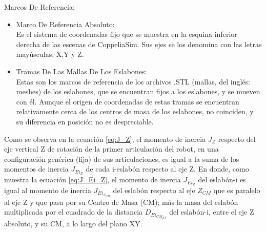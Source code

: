 \documentclass{article}
\begin{document}
\begin{sloppypar}
\hfill \break
Marcos De Referencia:
\begin{itemize}
    \item Marco De Referencia Absoluto:
        \\ Es el sistema de coordenadas fijo que se muestra en la esquina inferior derecha de las escenas de CoppeliaSim. Sus ejes se los denomina con las letras mayúsculas: X,Y y Z.
    \item Tramas De Las Mallas De Los Eslabones:
        \\ Estas son los marcos de referencia de los archivos .STL (mallas, del inglés: meshes) de los eslabones, que se encuentran fijos a los eslabones, y se mueven con él. Aunque el origen de coordenadas de estas tramas se encuentran relativamente cerca de los centros de masa de los eslabones, no coinciden, y su diferencia en posición no es despreciable.
\end{itemize}


Como se observa en la ecuación \ref{eq:J_Z}, el momento de inercia $J_Z$ respecto del eje vertical Z de rotación de la primer articulación del robot, en una configuración genérica (fija) de sus articulaciones, es igual a la suma de los momentos de inercia $J_{Ei_Z}$ de cada i-eslabón respecto al eje Z. En donde, como muestra la ecuación \ref{eq:J_Ei_Z}, el momento de inercia $J_{Ei_Z}$ del eslabón-i es igual al momento de inercia $J_{Ei_{Z_{CM}}}$ del eslabón respecto al eje $Z_{CM}$ que es paralelo al eje Z y que pasa por su Centro de Masa (CM); más la masa del eslabón multiplicada por el cuadrado de la distancia $D_{Ei_{CM_{XY}}}$ del eslabón-i, entre el eje Z absoluto, y su CM, a lo largo del plano XY.


\end{sloppypar}
\end{document}

